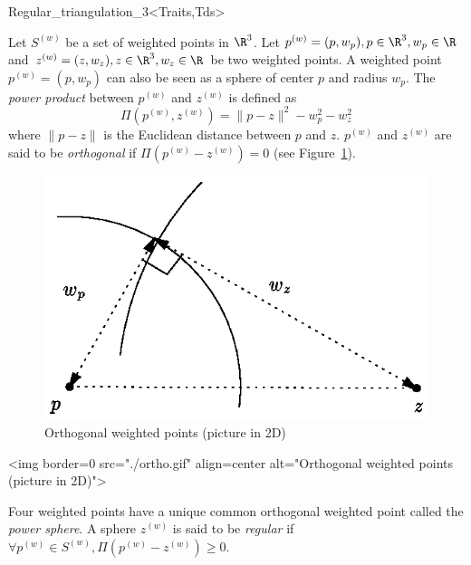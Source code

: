 \begin{ccClassTemplate}{Regular_triangulation_3<Traits,Tds>}
\ccDefinition

Let ${S}^{(w)}$ be a set of weighted points in $\R^3$. Let
${p}^{(w)}=(p,w_p), p\in\R^3, w_p\in\R$ and 
${z}^{(w)}=(z,w_z), z\in\R^3, w_z\in\R$ be two weighted points. 
A weighted point
${p}^{(w)}=(p,w_p)$ can also be seen as a sphere of center $p$ and
radius $w_p$. 
The \textit{power product} between ${p}^{(w)}$ and ${z}^{(w)}$ is
defined as 
\[\Pi({p}^{(w)},{z}^{(w)}) = {\|{p-z}\|^2-w_p^2-w_z^2}\]
where $\|{p-z}\|$ is the Euclidean distance between $p$ and $z$. 
 ${p}^{(w)}$ and ${z}^{(w)}$
are said to be \textit{orthogonal} if $\Pi{({p}^{(w)}-{z}^{(w)})}
= 0$ (see Figure~\ref{Triangulation3-fig-ortho}).

\begin{ccTexOnly}
\begin{figure}[htbp]
\begin{center} 
\includegraphics{ortho.eps} 
\end{center}
\caption{Orthogonal weighted points (picture in 2D)
\label{Triangulation3-fig-ortho}}
\end{figure} 
\end{ccTexOnly}

\begin{ccHtmlOnly}
<img border=0 src="./ortho.gif" align=center alt="Orthogonal weighted
points (picture in 2D)"> 
\end{ccHtmlOnly}

Four weighted points have a unique common orthogonal weighted point called
the \textit{power sphere}. A sphere ${z}^{(w)}$ is said to be
\textit{regular} if $\forall {p}^{(w)}\in{S}^{(w)},
\Pi{({p}^{(w)}-{z}^{(w)})}\geq 0$.


\end{ccClassTemplate}
